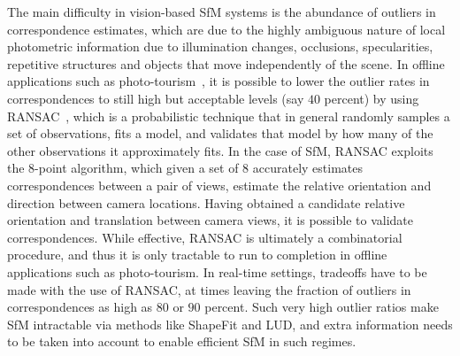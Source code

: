 \documentclass[10pt]{article}
\begin{document}
The main difficulty in vision-based SfM systems is the abundance of outliers in correspondence estimates, which are due to the highly ambiguous nature of local photometric information due to illumination changes, occlusions, specularities, repetitive structures and objects that move independently of the scene. In offline applications such as photo-tourism~\cite{SnavelyData}, it is possible to lower the outlier rates in correspondences to still high but acceptable levels (say $40$ percent) by using RANSAC~\cite{ransac}, which is a probabilistic technique that in general randomly samples a set of observations, fits a model, and validates that model by how many of the other observations it approximately fits. In the case of SfM, RANSAC exploits the 8-point algorithm, which given a set of 8 accurately estimates correspondences between a pair of views, estimate the relative orientation and direction between camera locations. Having obtained a candidate relative orientation and translation between camera views, it is possible to validate correspondences. While effective, RANSAC is ultimately a combinatorial procedure, and thus it is only tractable to run to completion in offline applications such as photo-tourism. In real-time settings, tradeoffs have to be made with the use of RANSAC, at times leaving the fraction of outliers in correspondences as high as $80$ or $90$ percent. Such very high outlier ratios make SfM intractable via methods like ShapeFit and LUD, and extra information needs to be taken into account to enable efficient SfM in such regimes. 
\end{document}
